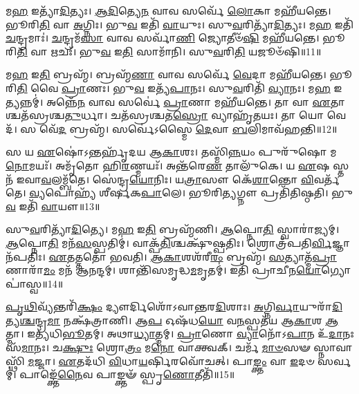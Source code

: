 𑌮\-\ul{𑌹} 𑌇𑌤𑍍𑌯𑌾᳴\-\ul{𑌦𑌿}\-𑌤𑍍𑌯𑌃। 
\-\ul{𑌆}\-\-\ul{𑌦𑌿}\-𑌤𑍍𑌯𑍇\-\ul{𑌨} 𑌵𑌾𑌵 𑌸𑌰𑍍𑌵𑍇᳴ \ul{𑌲𑍋}\-𑌕𑌾 𑌮𑌹𑍀᳴𑌯𑌨𑍍𑌤𑍇। 
𑌭𑍂𑌰𑌿\-\ul{𑌤𑌿} 𑌵𑌾 \ul{𑌅}\-𑌗𑍍𑌨𑌿𑌃। 
𑌭𑍁\-\ul{𑌵} 𑌇𑌤𑌿᳴ \ul{𑌵𑌾}\-𑌯𑍁𑌃। 
𑌸𑍁\-\ul{𑌵}\-𑌰𑌿𑌤𑍍𑌯𑌾᳴\-\ul{𑌦𑌿}\-𑌤𑍍𑌯𑌃। 
𑌮\-\ul{𑌹} 𑌇𑌤𑌿᳴ \ul{𑌚}\-𑌨𑍍𑌦𑍍𑌰𑌮𑌾𑌃॑। 
\-\ul{𑌚}\-𑌨𑍍𑌦𑍍𑌰𑌮᳴\-\ul{𑌸𑌾} 𑌵𑌾𑌵 𑌸𑌰𑍍𑌵𑌾᳴\-\ul{𑌣𑌿} 𑌜𑍍𑌯𑍋𑌤𑍀𑍞᳴\-\ul{𑌷𑌿} 𑌮𑌹𑍀᳴𑌯𑌨𑍍𑌤𑍇। 
𑌭𑍂𑌰𑌿\-\ul{𑌤𑌿} 𑌵𑌾 𑌋𑌚𑌃᳴। 
𑌭𑍁\-\ul{𑌵} 𑌇\-\ul{𑌤𑌿} 𑌸𑌾𑌮𑌾᳴𑌨𑌿। 
𑌸𑍁\-\ul{𑌵}\-𑌰𑌿\-\ul{𑌤𑌿} 𑌯𑌜𑍂𑍞᳴𑌷𑌿॥11॥

𑌮\-\ul{𑌹} 𑌇\-\ul{𑌤𑌿} 𑌬𑍍𑌰𑌹𑍍𑌮᳴। 
𑌬𑍍𑌰𑌹𑍍𑌮᳴\-\ul{𑌣𑌾} 𑌵𑌾𑌵 𑌸𑌰𑍍𑌵𑍇᳴ \ul{𑌵𑍇}\-𑌦𑌾 𑌮𑌹𑍀᳴𑌯𑌨𑍍𑌤𑍇। 
𑌭𑍂𑌰𑌿\-\ul{𑌤𑌿} 𑌵𑍈 \ul{𑌪𑍍𑌰𑌾}\-𑌣𑌃। 
𑌭𑍁\-\ul{𑌵} 𑌇𑌤𑍍𑌯᳴\-\ul{𑌪𑌾}\-𑌨𑌃। 
𑌸𑍁\-\ul{𑌵}\-𑌰𑌿𑌤𑌿᳴ \ul{𑌵𑍍𑌯𑌾}\-𑌨𑌃। 
𑌮\-\ul{𑌹} 𑌇𑌤𑍍𑌯𑌨𑍍𑌨𑌮𑍍॑। 
𑌅𑌨𑍍𑌨𑍇᳴\-\ul{𑌨} 𑌵𑌾𑌵 𑌸𑌰𑍍𑌵𑍇॑ \ul{𑌪𑍍𑌰𑌾}\-𑌣𑌾 𑌮𑌹𑍀᳴𑌯𑌨𑍍𑌤𑍇। 
𑌤𑌾 𑌵𑌾 \ul{𑌏}\-𑌤𑌾𑌶𑍍𑌚𑌤᳴𑌸𑍍𑌰𑌶𑍍𑌚\-\ul{𑌤𑍁}\-𑌰𑍍𑌧𑌾। 
𑌚𑌤᳴𑌸𑍍𑌰𑌶𑍍𑌚𑌤\-\ul{𑌸𑍍𑌰𑍋} 𑌵𑍍𑌯𑌾𑌹𑍃᳴𑌤𑌯𑌃। 
𑌤𑌾 𑌯𑍋 𑌵𑍇𑌦᳴। 
𑌸 𑌵𑍇᳴\-\ul{𑌦} 𑌬𑍍𑌰𑌹𑍍𑌮᳴। 
𑌸𑌰𑍍𑌵𑍇॑𑌽𑌸𑍍𑌮𑍈 \ul{𑌦𑍇}\-𑌵𑌾 \ul{𑌬}\-𑌲𑌿𑌮𑌾𑌵᳴𑌹𑌨𑍍𑌤𑌿॥12॥
\anuvakamend[\-\ul{𑌅}\-𑌸𑍗 \ul{𑌲𑍋}\-𑌕𑍋 𑌯𑌜𑍂𑍞᳴\-\ul{𑌷𑌿} 𑌵𑍇\-\ul{𑌦} 𑌦𑍍𑌵𑍇 𑌚᳴]

𑌸 𑌯 \ul{𑌏}\-𑌷𑍋॑𑌽𑌨𑍍𑌤𑌰𑍍\mbox{}𑌹𑍃᳴𑌦𑌯 𑌆\-\ul{𑌕𑌾}\-𑌶𑌃। 
𑌤𑌸𑍍𑌮𑌿᳴\-\ul{𑌨𑍍𑌨}\-𑌯𑌂 𑌪𑍁𑌰𑍁᳴𑌷𑍋 𑌮\-\ul{𑌨𑍋}\-𑌮𑌯𑌃᳴। 
𑌅𑌮𑍃᳴𑌤𑍋 𑌹𑌿\-\ul{𑌰}\-𑌣𑍍𑌮𑌯𑌃᳴। 
𑌅𑌨𑍍𑌤᳴𑌰𑍇\-\ul{𑌣} 𑌤𑌾𑌲𑍁᳴𑌕𑍇। 
𑌯 \ul{𑌏}\-𑌷 𑌸𑍍𑌤𑌨᳴ 𑌇𑌵𑌾\-\ul{𑌵}\-\-𑌲𑌮𑍍𑌬᳴𑌤𑍇। 
𑌸𑍇॑𑌨𑍍𑌦𑍍𑌰\-\ul{𑌯𑍋}\-𑌨𑌿𑌃। 
𑌯\-\ul{𑌤𑍍𑌰𑌾}\-𑌸𑍗 𑌕𑍇᳴\-\ul{𑌶𑌾}\-𑌨𑍍𑌤𑍋 \ul{𑌵𑌿}\-𑌵𑌰𑍍𑌤᳴𑌤𑍇। 
\-\ul{𑌵𑍍𑌯}\-𑌪𑍋𑌹𑍍𑌯᳴ 𑌶𑍀𑌰𑍍\mbox{}𑌷𑌕\-\ul{𑌪𑌾}\-𑌲𑍇। 
𑌭𑍂𑌰𑌿\-\ul{𑌤𑍍𑌯}\-𑌗𑍍𑌨𑍗 𑌪𑍍𑌰𑌤𑌿᳴\-𑌤𑌿𑌷𑍍𑌠𑌤𑌿। 
𑌭𑍁\-\ul{𑌵} 𑌇𑌤𑌿᳴ \ul{𑌵𑌾}\-𑌯𑍗॥13॥

𑌸𑍁\-\ul{𑌵}\-𑌰𑌿𑌤𑍍𑌯𑌾᳴\-\ul{𑌦𑌿}\-𑌤𑍍𑌯𑍇। 
𑌮\-\ul{𑌹} 𑌇\-\ul{𑌤𑌿} 𑌬𑍍𑌰𑌹𑍍𑌮᳴𑌣𑌿। 
\-\ul{𑌆}\-𑌪𑍍𑌨𑍋\-\ul{𑌤𑌿} 𑌸𑍍𑌵𑌾𑌰𑌾॑𑌜𑍍𑌯𑌮𑍍। 
\-\ul{𑌆}\-𑌪𑍍𑌨𑍋\-\ul{𑌤𑌿} 𑌮𑌨᳴\-\ul{𑌸}\-𑌸𑍍𑌪𑌤𑌿𑌮𑍍॑। 
𑌵𑌾𑌕𑍍𑌪᳴\-\ul{𑌤𑌿}\-𑌶𑍍𑌚𑌕𑍍𑌷𑍁᳴𑌷𑍍𑌪𑌤𑌿𑌃। 
𑌶𑍍𑌰𑍋𑌤𑍍𑌰᳴𑌪𑌤𑌿\-\ul{𑌰𑍍𑌵𑌿}\-\-𑌜𑍍𑌞𑌾𑌨᳴𑌪𑌤𑌿𑌃। 
\-\ul{𑌏}\-𑌤𑌤𑍍𑌤𑌤𑍋᳴ 𑌭𑌵𑌤𑌿। 
\-\ul{𑌆}\-\-\ul{𑌕𑌾}\-𑌶𑌶᳴𑌰𑍀\-\ul{𑌰𑌂} 𑌬𑍍𑌰𑌹𑍍𑌮᳴। 
\-\ul{𑌸}\-𑌤𑍍𑌯𑌾𑌤𑍍𑌮᳴\-\ul{𑌪𑍍𑌰𑌾}\-𑌣𑌾𑌰𑌾᳴\-\ul{𑌮𑌂} 𑌮𑌨᳴ 𑌆𑌨𑌨𑍍𑌦𑌮𑍍। 
𑌶𑌾𑌨𑍍𑌤𑌿᳴𑌸𑌮𑍃𑌦𑍍𑌧\-\ul{𑌮}\-𑌮𑍃𑌤𑌮𑍍॑। 
𑌇𑌤𑌿᳴ 𑌪𑍍𑌰𑌾𑌚𑍀𑌨\-\ul{𑌯𑍋}\-𑌗𑍍𑌯𑍋𑌪𑌾॑𑌸𑍍𑌵॥14॥
\anuvakamend[\-\ul{𑌵𑌾}\-𑌯𑌾\-\ul{𑌵}\-𑌮𑍃\-\ul{𑌤}\-𑌮𑍇𑌕𑌂᳴ 𑌚]

\-\ul{𑌪𑍃}\-\-\ul{𑌥𑌿}\-𑌵𑍍𑌯᳴𑌨𑍍𑌤𑌰𑌿᳴\-\ul{𑌕𑍍𑌷𑌂} 𑌦𑍍𑌯𑍗𑌰𑍍𑌦𑌿𑌶𑍋᳴𑌽𑌵𑌾𑌨𑍍𑌤𑌰\-\ul{𑌦𑌿}\-𑌶𑌾𑌃। 
\-\ul{𑌅}\-𑌗𑍍𑌨𑌿\-\ul{𑌰𑍍𑌵𑌾}\-𑌯𑍁𑌰𑌾᳴\-\ul{𑌦𑌿}\-𑌤𑍍𑌯\-\-\ul{𑌶𑍍𑌚}\-𑌨𑍍𑌦𑍍𑌰\-\ul{𑌮𑌾} 𑌨𑌕𑍍𑌷᳴𑌤𑍍𑌰𑌾𑌣𑌿। 
𑌆\-\ul{𑌪} 𑌓𑌷᳴𑌧\-\ul{𑌯𑍋} 𑌵\-\ul{𑌨}\-𑌸𑍍𑌪𑌤᳴𑌯 𑌆\-\ul{𑌕𑌾}\-𑌶 \ul{𑌆}\-𑌤𑍍𑌮𑌾। 
𑌇𑌤𑍍𑌯᳴𑌧𑌿\-\-\ul{𑌭𑍂}\-𑌤𑌮𑍍। 
𑌅𑌥𑌾\-\ul{𑌧𑍍𑌯𑌾}\-𑌤𑍍𑌮𑌮𑍍। 
\-\ul{𑌪𑍍𑌰𑌾}\-𑌣𑍋 \ul{𑌵𑍍𑌯𑌾}\-𑌨𑍋᳴𑌽\-\ul{𑌪𑌾}\-𑌨 𑌉᳴\-\ul{𑌦𑌾}\-𑌨𑌃 𑌸᳴\-\ul{𑌮𑌾}\-𑌨𑌃। 
𑌚\-\ul{𑌕𑍍𑌷𑍁𑌃} 𑌶𑍍𑌰𑍋\-\ul{𑌤𑍍𑌰𑌂} 𑌮\-\ul{𑌨𑍋} 𑌵𑌾𑌕𑍍𑌤𑍍𑌵𑌕𑍍। 
𑌚𑌰𑍍𑌮᳴ \ul{𑌮𑌾}\-\-\ul{𑍞}\-𑌸𑍟 𑌸𑍍𑌨𑌾𑌵𑌾𑌸𑍍𑌥𑌿᳴ \ul{𑌮}\-𑌜𑍍𑌜𑌾। 
\-\ul{𑌏}\-𑌤𑌦᳴𑌧𑌿 \ul{𑌵𑌿}\-𑌧𑌾\-\ul{𑌯}\-\-𑌰𑍍\mbox{}\-\ul{𑌷𑌿}\-\-𑌰𑌵𑍋᳴𑌚𑌤𑍍। 
𑌪𑌾\-\ul{𑌙𑍍𑌕𑍍𑌤𑌂} 𑌵𑌾 \ul{𑌇}\-𑌦𑍞 𑌸𑌰𑍍𑌵𑌮𑍍॑। 
𑌪𑌾𑌙𑍍𑌕𑍍𑌤𑍇᳴\-\ul{𑌨𑍈}\-𑌵 𑌪𑌾𑌙𑍍𑌕𑍍𑌤𑍟᳴ 𑌸𑍍𑌪𑍃\-\ul{𑌣𑍋}\-𑌤𑍀𑌤𑌿᳴॥15॥
\anuvakamend[𑌸\-\ul{𑌰𑍍𑌵}\-𑌮𑍇𑌕𑌂᳴ 𑌚]

